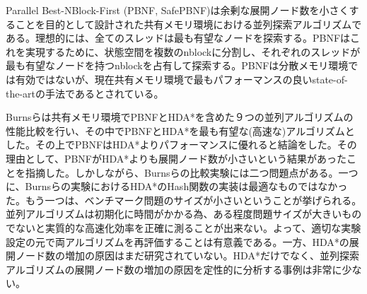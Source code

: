 \documentclass[uplatex]{jsarticle}
\begin{document}
Parallel Best-NBlock-First (PBNF, SafePBNF)は余剰な展開ノード数を小さくすることを目的として設計された共有メモリ環境における並列探索アルゴリズムである\cite{Burns2010}。理想的には、全てのスレッドは最も有望なノードを探索する。PBNFはこれを実現するために、状態空間を複数のnblockに分割し、それぞれのスレッドが最も有望なノードを持つnblockを占有して探索する。PBNFは分散メモリ環境では有効ではないが、現在共有メモリ環境で最もパフォーマンスの良いstate-of-the-artの手法であるとされている。
\newline

Burnsらは共有メモリ環境でPBNFとHDA*を含めた９つの並列アルゴリズムの性能比較を行い、その中でPBNFとHDA*を最も有望な(高速な)アルゴリズムとした。その上でPBNFはHDA*よりパフォーマンスに優れると結論をした。その理由として、PBNFがHDA*よりも展開ノード数が小さいという結果があったことを指摘した。しかしながら、Burnsらの比較実験には二つ問題点がある。一つに、Burnsらの実験におけるHDA*のHash関数の実装は最適なものではなかった。もう一つは、ベンチマーク問題のサイズが小さいということが挙げられる。並列アルゴリズムは初期化に時間がかかる為、ある程度問題サイズが大きいものでないと実質的な高速化効率を正確に測ることが出来ない。よって、適切な実験設定の元で両アルゴリズムを再評価することは有意義である。一方、HDA*の展開ノード数の増加の原因はまだ研究されていない。HDA*だけでなく、並列探索アルゴリズムの展開ノード数の増加の原因を定性的に分析する事例は非常に少ない。
\end{document}
